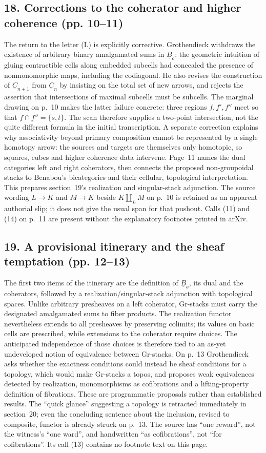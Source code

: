 \documentclass[10pt,oneside]{book}
\begin{document}
\subsection*{18. Corrections to the coherator and higher coherence (pp. 10--11)}
The return to the letter (L) is explicitly corrective. Grothendieck withdraws the existence of arbitrary binary amalgamated sums in $\underline B_o$: the geometric intuition of gluing contractible cells along embedded subcells had concealed the presence of nonmonomorphic maps, including the codiagonal. He also revises the construction of $\underline C_{n+1}$ from $\underline C_n$ by insisting on the total set of new arrows, and rejects the assertion that intersections of maximal subcells must be subcells. The marginal drawing on p.~10 makes the latter failure concrete: three regions $f,f',f''$ meet so that $f\cap f''=\{s,t\}$. The scan therefore supplies a two-point intersection, not the quite different formula in the initial transcription. A separate correction explains why associativity beyond primary composition cannot be represented by a single homotopy arrow: the sources and targets are themselves only homotopic, so squares, cubes and higher coherence data intervene. Page~11 names the dual categories left and right coherators, then connects the proposed non-groupoidal stacks to Benabou's bicategories and their cellular, topological interpretation. This prepares section~19's realization and singular-stack adjunction. The source wording $L\to K$ and $M\to K$ beside $K\amalg_L M$ on p.~10 is retained as an apparent authorial slip; it does not give the usual span for that pushout. Calls (11) and (14) on p.~11 are present without the explanatory footnotes printed in arXiv.

\subsection*{19. A provisional itinerary and the sheaf temptation (pp. 12--13)}
The first two items of the itinerary are the definition of $\underline B_o$, its dual and the coherators, followed by a realization/singular-stack adjunction with topological spaces. Unlike arbitrary presheaves on a left coherator, Gr-stacks must carry the designated amalgamated sums to fiber products. The realization functor nevertheless extends to all presheaves by preserving colimits; its values on basic cells are prescribed, while extensions to the coherator require choices. The anticipated independence of those choices is therefore tied to an as-yet undeveloped notion of equivalence between Gr-stacks. On p.~13 Grothendieck asks whether the exactness conditions could instead be sheaf conditions for a topology, which would make Gr-stacks a topos, and proposes weak equivalences detected by realization, monomorphisms as cofibrations and a lifting-property definition of fibrations. These are programmatic proposals rather than established results. The ``quick glance'' suggesting a topology is retracted immediately in section~20; even the concluding sentence about the inclusion, revised to composite, functor is already struck on p.~13. The source has ``one reward'', not the witness's ``one ward'', and handwritten ``as cofibrations'', not ``for cofibrations''. Its call (13) contains no footnote text on this page.
\end{document}
